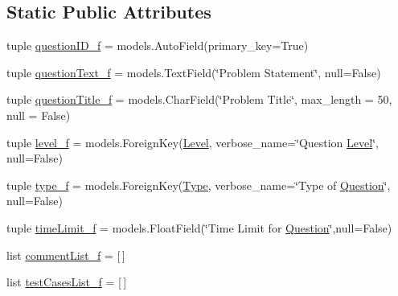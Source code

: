 \subsection*{Static Public Attributes}
\begin{DoxyCompactItemize}
\item 
tuple \hyperlink{class_ecodena_1_1_question_1_1models_1_1_question_a7bf8bc3dae949f1011c2e26226309898}{questionID\_\-f} = models.AutoField(primary\_\-key=True)
\item 
tuple \hyperlink{class_ecodena_1_1_question_1_1models_1_1_question_a68dff1fccf327def311e574aef8c7385}{questionText\_\-f} = models.TextField(\char`\"{}Problem Statement\char`\"{}, null=False)
\item 
tuple \hyperlink{class_ecodena_1_1_question_1_1models_1_1_question_a512bdc07c3ee6ad6f64bf06810cdbd77}{questionTitle\_\-f} = models.CharField(\char`\"{}Problem Title\char`\"{}, max\_\-length = 50, null = False)
\item 
tuple \hyperlink{class_ecodena_1_1_question_1_1models_1_1_question_a6dfb4e057e2757e3ea7387fa9aa6b741}{level\_\-f} = models.ForeignKey(\hyperlink{class_ecodena_1_1_question_1_1models_1_1_level}{Level}, verbose\_\-name=\char`\"{}Question \hyperlink{class_ecodena_1_1_question_1_1models_1_1_level}{Level}\char`\"{}, null=False)
\item 
tuple \hyperlink{class_ecodena_1_1_question_1_1models_1_1_question_ae09f8ef0052f7c65df2383940124d5ce}{type\_\-f} = models.ForeignKey(\hyperlink{class_ecodena_1_1_question_1_1models_1_1_type}{Type}, verbose\_\-name=\char`\"{}Type of \hyperlink{class_ecodena_1_1_question_1_1models_1_1_question}{Question}\char`\"{}, null=False)
\item 
tuple \hyperlink{class_ecodena_1_1_question_1_1models_1_1_question_a4143fa9996843ba6c2febcab8e8ceae8}{timeLimit\_\-f} = models.FloatField(\char`\"{}Time Limit for \hyperlink{class_ecodena_1_1_question_1_1models_1_1_question}{Question}\char`\"{},null=False)
\item 
list \hyperlink{class_ecodena_1_1_question_1_1models_1_1_question_ae202257a6a3b5630cd345936d8e258c3}{commentList\_\-f} = \mbox{[}$\,$\mbox{]}
\item 
list \hyperlink{class_ecodena_1_1_question_1_1models_1_1_question_aab630f0c2e6a45bd234c67481afc1448}{testCasesList\_\-f} = \mbox{[}$\,$\mbox{]}
\end{DoxyCompactItemize}
